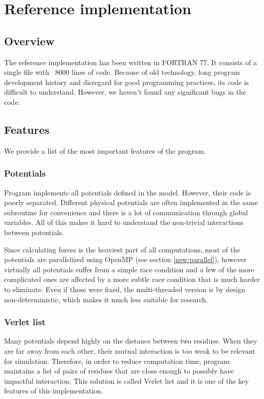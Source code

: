 \chapter{Reference implementation}\label{c:ref_impl}

\section{Overview}

The reference implementation has been written in FORTRAN 77. It consists of a single file with ~8000 lines of code. Because of old technology, long program  development history and disregard for good programming practices, its code is difficult to understand. However, we haven't found any significant bugs in the code.


\section{Features}
We provide a list of the most important features of the program.

\subsection {Potentials}

Program implements all potentials defined in the model. However, their code is poorly separated. Different physical potentials are often implemented in the same subroutine for convenience and there is a lot of communication through global variables. All of this makes it hard to understand the non-trivial interactions between potentials. 

Since calculating forces is the heaviest part of all computations, most of the potentials are parallelized using OpenMP (see section \ref{new:parallel}), however virtually all potentials suffer from a simple race condition and a few of the more complicated ones are affected by a more subtle race condition that is much harder to eliminate. Even if those were fixed, the multi-threaded version is by design non-deterministic, which makes it much less suitable for research. 

\subsection {Verlet list} \label{ref:verlet}
Many potentials depend highly on the distance between two residues. When they are far away from each other, their mutual interaction is too weak to be relevant for simulation. Therefore, in order to reduce computation time, program maintains a list of pairs of residues that are close enough to possibly have impactful interaction. This solution is called Verlet list and it is one of the key features of this implementation. 

